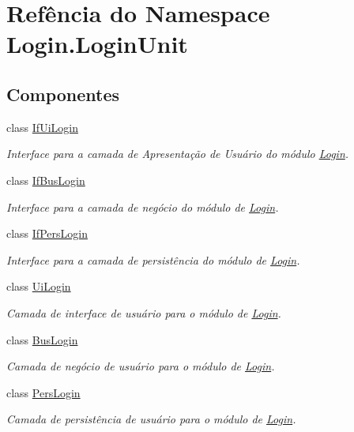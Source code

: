 \hypertarget{namespaceLogin_1_1LoginUnit}{\section{Refência do Namespace Login.\-Login\-Unit}
\label{namespaceLogin_1_1LoginUnit}
}
\subsection*{Componentes}
\begin{DoxyCompactItemize}
\item 
class \hyperlink{classLogin_1_1LoginUnit_1_1IfUiLogin}{If\-Ui\-Login}
\begin{DoxyCompactList}\small\item\em Interface para a camada de Apresentação de Usuário do módulo \hyperlink{namespaceLogin}{Login}. \end{DoxyCompactList}\item 
class \hyperlink{classLogin_1_1LoginUnit_1_1IfBusLogin}{If\-Bus\-Login}
\begin{DoxyCompactList}\small\item\em Interface para a camada de negócio do módulo de \hyperlink{namespaceLogin}{Login}. \end{DoxyCompactList}\item 
class \hyperlink{classLogin_1_1LoginUnit_1_1IfPersLogin}{If\-Pers\-Login}
\begin{DoxyCompactList}\small\item\em Interface para a camada de persistência do módulo de \hyperlink{namespaceLogin}{Login}. \end{DoxyCompactList}\item 
class \hyperlink{classLogin_1_1LoginUnit_1_1UiLogin}{Ui\-Login}
\begin{DoxyCompactList}\small\item\em Camada de interface de usuário para o módulo de \hyperlink{namespaceLogin}{Login}. \end{DoxyCompactList}\item 
class \hyperlink{classLogin_1_1LoginUnit_1_1BusLogin}{Bus\-Login}
\begin{DoxyCompactList}\small\item\em Camada de negócio de usuário para o módulo de \hyperlink{namespaceLogin}{Login}. \end{DoxyCompactList}\item 
class \hyperlink{classLogin_1_1LoginUnit_1_1PersLogin}{Pers\-Login}
\begin{DoxyCompactList}\small\item\em Camada de persistência de usuário para o módulo de \hyperlink{namespaceLogin}{Login}. \end{DoxyCompactList}\end{DoxyCompactItemize}
